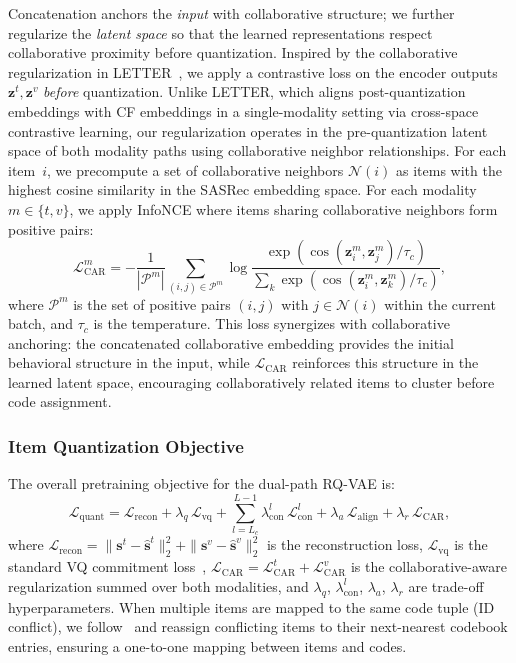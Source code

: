 \documentclass[sigconf, anonymous, review]{acmart}
\begin{document}
Concatenation anchors the \emph{input} with collaborative structure; we further regularize the \emph{latent space} so that the learned representations respect collaborative proximity before quantization.
%
Inspired by the collaborative regularization in LETTER~\cite{letter}, we apply a contrastive loss on the encoder outputs $\mathbf{z}^t,\mathbf{z}^v$ \emph{before} quantization.
%
Unlike LETTER, which aligns post-quantization embeddings with CF embeddings in a single-modality setting via cross-space contrastive learning, our regularization operates in the pre-quantization latent space of both modality paths using collaborative neighbor relationships.
%
For each item~$i$, we precompute a set of collaborative neighbors $\mathcal{N}(i)$ as items with the highest cosine similarity in the SASRec embedding space.
%
For each modality $m \in \{t,v\}$, we apply InfoNCE where items sharing collaborative neighbors form positive pairs:
\begin{equation}
    \mathcal{L}_{\text{CAR}}^m = -\frac{1}{|\mathcal{P}^m|}\sum_{(i,j)\in\mathcal{P}^m}\log\frac{\exp(\cos(\mathbf{z}_i^m,\mathbf{z}_j^m)/\tau_c)}{\sum_{k}\exp(\cos(\mathbf{z}_i^m,\mathbf{z}_k^m)/\tau_c)},
\end{equation}
where $\mathcal{P}^m$ is the set of positive pairs $(i,j)$ with $j \in \mathcal{N}(i)$ within the current batch, and $\tau_c$ is the temperature.
%
This loss synergizes with collaborative anchoring: the concatenated collaborative embedding provides the initial behavioral structure in the input, while $\mathcal{L}_{\text{CAR}}$ reinforces this structure in the learned latent space, encouraging collaboratively related items to cluster before code assignment.

\subsubsection{Item Quantization Objective}

The overall pretraining objective for the dual-path RQ-VAE is:
\begin{equation}
    \mathcal{L}_{\text{quant}} = \mathcal{L}_{\text{recon}} + \lambda_q\,\mathcal{L}_{\text{vq}} + \sum_{l=L_c}^{L-1}\lambda_{\text{con}}^l\,\mathcal{L}_{\text{con}}^l + \lambda_a\,\mathcal{L}_{\text{align}} + \lambda_r\,\mathcal{L}_{\text{CAR}},
    \label{eq:quant}
\end{equation}
where $\mathcal{L}_{\text{recon}} = \|\mathbf{s}^t - \hat{\mathbf{s}}^t\|_2^2 + \|\mathbf{s}^v - \hat{\mathbf{s}}^v\|_2^2$ is the reconstruction loss, $\mathcal{L}_{\text{vq}}$ is the standard VQ commitment loss~\cite{image_rqvae}, $\mathcal{L}_{\text{CAR}} = \mathcal{L}_{\text{CAR}}^t + \mathcal{L}_{\text{CAR}}^v$ is the collaborative-aware regularization summed over both modalities, and $\lambda_q$, $\lambda_{\text{con}}^l$, $\lambda_a$, $\lambda_r$ are trade-off hyperparameters.
% 
When multiple items are mapped to the same code tuple (ID conflict), we follow~\citet{mql} and reassign conflicting items to their next-nearest codebook entries, ensuring a one-to-one mapping between items and codes.
\end{document}
